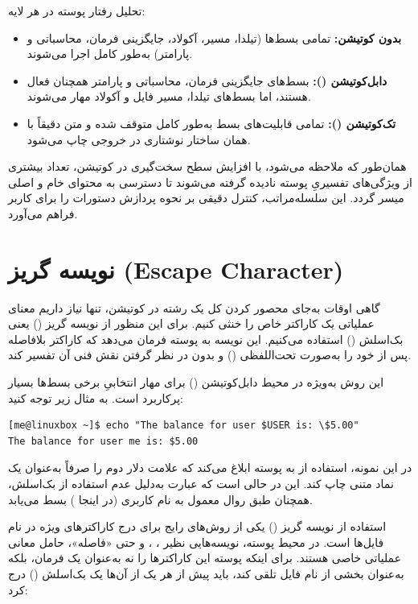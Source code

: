 تحلیل رفتار پوسته در هر لایه:

\begin{itemize}
  \item \textbf{بدون کوتیشن:} تمامی بسط‌ها (تیلدا، مسیر، آکولاد، جایگزینی فرمان، محاسباتی و پارامتر) به‌طور کامل اجرا می‌شوند.
  \item \textbf{دابل‌کوتیشن ():} بسط‌های جایگزینی فرمان، محاسباتی و پارامتر همچنان فعال هستند، اما بسط‌های تیلدا، مسیر فایل و آکولاد مهار می‌شوند.
  \item \textbf{تک‌کوتیشن ():} تمامی قابلیت‌های بسط به‌طور کامل متوقف شده و متن دقیقاً با همان ساختار نوشتاری در خروجی چاپ می‌شود.
\end{itemize}

همان‌طور که ملاحظه می‌شود، با افزایش سطح سخت‌گیری در کوتیشن، تعداد بیشتری از ویژگی‌های تفسیریِ پوسته نادیده گرفته می‌شوند تا دسترسی به محتوای خام و اصلی میسر گردد. این سلسله‌مراتب، کنترل دقیقی بر نحوه پردازش دستورات را برای کاربر فراهم می‌آورد.

\section{نویسه گریز (Escape Character)}

گاهی اوقات به‌جای محصور کردن کل یک رشته در کوتیشن، تنها نیاز داریم معنای عملیاتی یک کاراکتر خاص را خنثی کنیم. برای این منظور از نویسه گریز () یعنی بک‌اسلش (\cmd{\textbackslash}) استفاده می‌کنیم. این نویسه به پوسته فرمان می‌دهد که کاراکتر بلافاصله پس از خود را به‌صورت تحت‌اللفظی () و بدون در نظر گرفتن نقش فنی آن تفسیر کند.

این روش به‌ویژه در محیط دابل‌کوتیشن () برای مهار انتخابیِ برخی بسط‌ها بسیار پرکاربرد است. به مثال زیر توجه کنید:

\begin{latin}
\begin{lstlisting}
[me@linuxbox ~]$ echo "The balance for user $USER is: \$5.00"
The balance for user me is: $5.00
\end{lstlisting}
\end{latin}

در این نمونه، استفاده از \cmd{\textbackslash\$} به پوسته ابلاغ می‌کند که علامت دلار دوم را صرفاً به‌عنوان یک نماد متنی چاپ کند. این در حالی است که عبارت  به‌دلیل عدم استفاده از بک‌اسلش، همچنان طبق روال معمول به نام کاربری (در اینجا ) بسط می‌یابد.

استفاده از نویسه گریز () یکی از روش‌های رایج برای درج کاراکترهای ویژه در نام فایل‌ها است. در محیط پوسته، نویسه‌هایی نظیر \cmd{\$}، \cmd{!}، \cmd{\&} و حتی «فاصله»، حامل معانی عملیاتی خاصی هستند. برای اینکه پوسته این کاراکترها را نه به‌عنوان یک فرمان، بلکه به‌عنوان بخشی از نام فایل تلقی کند، باید پیش از هر یک از آن‌ها یک بک‌اسلش (\cmd{\textbackslash}) درج کرد:

